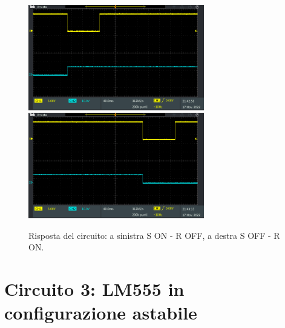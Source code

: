 \documentclass{report}
\begin{document}
\begin{figure}[h!]
	\centering
	\includegraphics[height=4.6cm]{immagini/TEK00016}
	\includegraphics[height=4.6cm]{immagini/TEK00017}
	\caption{Risposta del circuito: a sinistra S ON - R OFF, a destra S OFF - R ON.}
	\label{figura:TEK00012e13}
\end{figure}

\newpage
\section{Circuito 3: LM555 in configurazione astabile}
\end{document}
